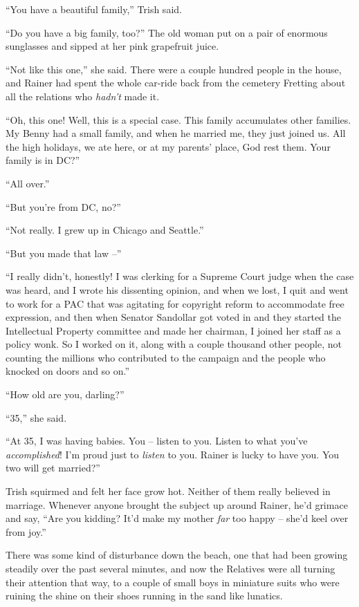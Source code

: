 “You have a beautiful family,” Trish said.

“Do you have a big family, too?” The old woman put on a pair of 
enormous sunglasses and sipped at her pink grapefruit juice.

“Not like this one,” she said. There were a couple hundred people 
in the house, and Rainer had spent the whole car-ride back from the 
cemetery Fretting about all the relations who \emph{hadn't} made it.

“Oh, this one! Well, this is a special case. This family accumulates 
other families. My Benny had a small family, and when he married me, 
they just joined us. All the high holidays, we ate here, or at my 
parents' place, God rest them. Your family is in DC?”

“All over.”

“But you're from DC, no?”

“Not really. I grew up in Chicago and Seattle.”

“But you made that law --”

“I really didn't, honestly! I was clerking for a Supreme Court judge 
when the case was heard, and I wrote his dissenting opinion, and when 
we lost, I quit and went to work for a PAC that was agitating for 
copyright reform to accommodate free expression, and then when Senator 
Sandollar got voted in and they started the Intellectual Property 
committee and made her chairman, I joined her staff as a policy wonk. 
So I worked on it, along with a couple thousand other people, not 
counting the millions who contributed to the campaign and the people 
who knocked on doors and so on.”

“How old are you, darling?”

“35,” she said.

“At 35, I was having babies. You -- listen to you. Listen to what 
you've \emph{accomplished}! I'm proud just to \emph{listen} to you. 
Rainer is lucky to have you. You two will get married?”

Trish squirmed and felt her face grow hot. Neither of them really 
believed in marriage. Whenever anyone brought the subject up around 
Rainer, he'd grimace and say, “Are you kidding? It'd make my mother 
\emph{far} too happy -- she'd keel over from joy.”

There was some kind of disturbance down the beach, one that had been 
growing steadily over the past several minutes, and now the Relatives 
were all turning their attention that way, to a couple of small boys in 
miniature suits who were ruining the shine on their shoes running in 
the sand like lunatics.

